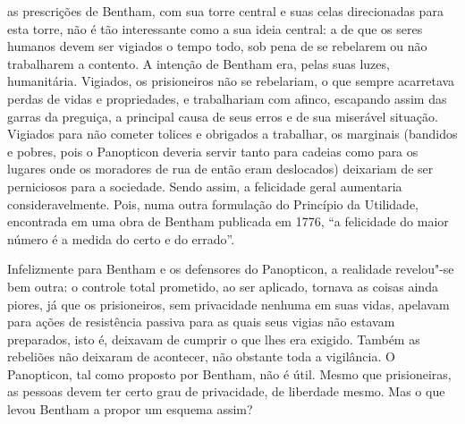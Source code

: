 as prescrições de Bentham, com sua torre central e suas celas
direcionadas para esta torre, não é tão interessante como a sua ideia
central: a de que os seres humanos devem ser vigiados o tempo todo, sob
pena de se rebelarem ou não trabalharem a contento. A intenção de
Bentham era, pelas suas luzes, humanitária. Vigiados, os prisioneiros
não se rebelariam, o que sempre acarretava perdas de vidas e
propriedades, e trabalhariam com afinco, escapando assim das garras da
preguiça, a principal causa de seus erros e de sua miserável situação.
Vigiados para não cometer tolices e obrigados a trabalhar, os marginais
(bandidos e pobres, pois o Panopticon deveria servir tanto para cadeias
como para os lugares onde os moradores de rua de então eram deslocados)
deixariam de ser perniciosos para a sociedade. Sendo assim, a
felicidade geral aumentaria consideravelmente. Pois, numa outra
formulação do Princípio da Utilidade, encontrada em uma obra de
Bentham publicada em 1776, ``a felicidade do maior número 
é a medida do certo e do errado''. 

Infelizmente para Bentham e os defensores do Panopticon, a realidade
revelou"-se bem outra: o controle total prometido, ao ser aplicado,
tornava as coisas ainda piores, já que os prisioneiros, sem privacidade
nenhuma em suas vidas, apelavam para ações de resistência passiva para
as quais seus vigias não estavam preparados, isto é, deixavam de
cumprir o que lhes era exigido. Também as rebeliões não deixaram de
acontecer, não obstante toda a vigilância. O Panopticon, tal como
proposto por Bentham, não é útil. Mesmo que prisioneiras, as pessoas
devem ter certo grau de privacidade, de liberdade mesmo. Mas o que
levou Bentham a propor um esquema assim? 

